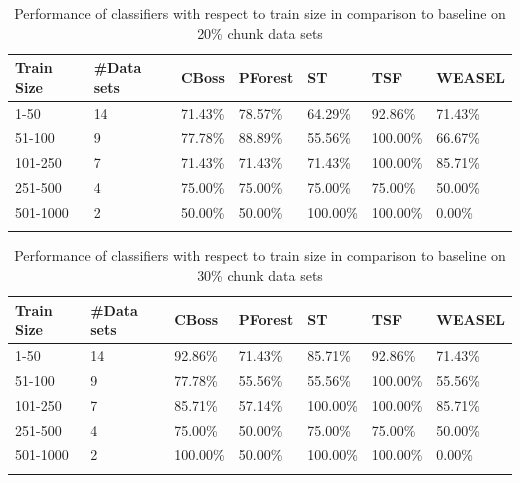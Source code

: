 \begin{table}[hbt!]
	\setlength\extrarowheight{2pt} %
	\begin{tabularx}{\textwidth}{|X|X|X|X|X|X|X|}
	\hline
	\textbf{Train Size} & \textbf{\#Data sets} & \textbf{CBoss} & \textbf{PForest} & \textbf{ST} & \textbf{TSF} & \textbf{WEASEL} \\ \hline
		1-50 & 14 & 71.43\% & 78.57\% & 64.29\% & 92.86\% & 71.43\% \\ \hline
		51-100 & 9 & 77.78\% & 88.89\% & 55.56\% & 100.00\% & 66.67\% \\ \hline
		101-250 & 7 & 71.43\% & 71.43\% & 71.43\% & 100.00\% & 85.71\% \\ \hline
		251-500 & 4 & 75.00\% & 75.00\% & 75.00\% & 75.00\% & 50.00\% \\ \hline
		501-1000 & 2 &50.00\% & 50.00\% & 100.00\% & 100.00\% & 0.00\% \\ \hline
	\caption{Performance of classifiers with respect to train size in comparison to baseline on 20\% chunk data sets}
	\label{TableSize20}
  \end{tabularx}
\end{table}

\begin{table}[hbt!]
	\setlength\extrarowheight{2pt} %
	\begin{tabularx}{\textwidth}{|X|X|X|X|X|X|X|}
	\hline
	\textbf{Train Size} & \textbf{\#Data sets} & \textbf{CBoss} & \textbf{PForest} & \textbf{ST} & \textbf{TSF} & \textbf{WEASEL} \\ \hline
		1-50 & 14 & 92.86\% & 71.43\% & 85.71\% & 92.86\% & 71.43\% \\ \hline
		51-100 & 9 & 77.78\% & 55.56\% & 55.56\% & 100.00\% & 55.56\% \\ \hline
		101-250 & 7 & 85.71\% & 57.14\% & 100.00\% & 100.00\% & 85.71\% \\ \hline
		251-500 & 4 & 75.00\% & 50.00\% & 75.00\% & 75.00\% & 50.00\% \\ \hline
		501-1000 & 2 &100.00\% & 50.00\% & 100.00\% & 100.00\% & 0.00\% \\ \hline
	\caption{Performance of classifiers with respect to train size in comparison to baseline on 30\% chunk data sets}
	\label{TableSize30}
  \end{tabularx}
\end{table}

